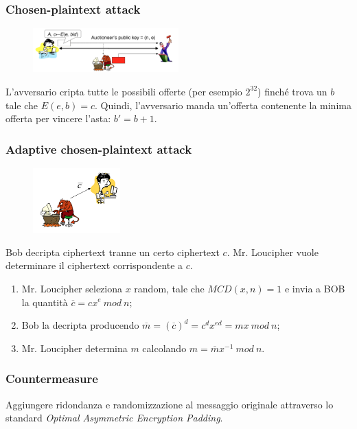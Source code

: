 \documentclass[a4paper,12pt]{article}
\begin{document}
\subsubsection{Chosen-plaintext attack}

\begin{figure}[H]
  \centering
  \includegraphics[width=0.5\textwidth]{img/chosen-plaintext-attack}
\end{figure}
L'avversario cripta tutte le possibili offerte (per esempio $2^{32}$) finché trova un $b$ tale che $E(e, b) = c$. Quindi, l'avversario manda un'offerta contenente la minima offerta per vincere l'asta: $b' = b + 1$.

\subsubsection{Adaptive chosen-plaintext attack}
\begin{figure}[H]
  \centering
  \includegraphics[width=0.3\textwidth]{img/chosen-ciphertext-attack}
\end{figure}
Bob decripta ciphertext tranne un certo ciphertext $c$. Mr. Loucipher vuole determinare il ciphertext corrispondente a $c$.
\begin{enumerate}
	\item Mr. Loucipher seleziona $x$ random, tale che $MCD(x, n) = 1$ e invia a BOB la quantità $\overline{c} = cx^e\ mod\ n$;
	\item Bob la decripta producendo $\overline{m} = (\overline{c})^d = c^d x^{ed} = mx\ mod\ n$;
	\item Mr. Loucipher determina $m$ calcolando $m = \overline{m} x^{-1}\ mod\ n$.
\end{enumerate} 

\subsubsection{Countermeasure}
Aggiungere ridondanza e randomizzazione al messaggio originale attraverso lo standard \textit{Optimal Asymmetric Encryption Padding}.
\end{document}
